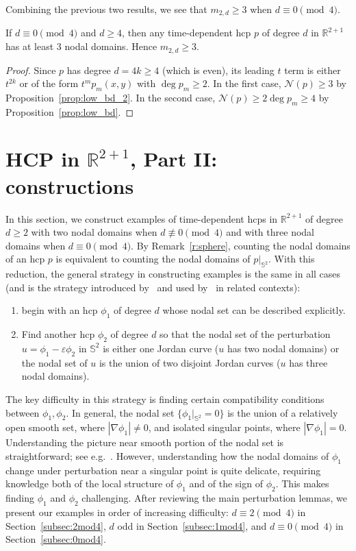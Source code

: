 \documentclass[AHL,Unicode,longabstracts,published]{cedram}
\newcommand{\R}{\mathbb{R}}
\newcommand{\sphere}{\mathbb{S}}
\newcommand{\nodal}{\mathcal{N}}
\renewcommand{\epsilon}{\varepsilon}
\newcommand*{\relabel}{
\renewcommand{\labelenumi}{(\theenumi)}}
\newcommand*{\alphenumi}{
\renewcommand*{\theenumi}{\alph{enumi}}\relabel}
\newcommand{\R}{\mathbb{R}}
\begin{document}
Combining the previous two results, we see that $m_{2,d} \ge 3$ when $d \equiv 0 \pmod 4$.
\begin{coro} \label{cor:0_mod_4}
If $d \equiv 0 \pmod 4$ and $d\geq 4$, then any time-dependent hcp $p$ of degree $d$ in $\R^{2+1}$ has at least $3$ nodal domains. Hence $m_{2,d}\geq 3$.
\end{coro}
\begin{proof}
Since $p$ has degree $d=4k\geq 4$ ({which is even}), its leading $t$ term is either $t^{2k}$ or of the form $t^m p_m(x,y)$ with $\deg p_m \ge 2$. In the first case, $\nodal(p)\geq 3$ by Proposition~\ref{prop:low_bd_2}. In the second case, $\nodal(p)\geq 2\deg p_m\geq 4$ by Proposition~\ref{prop:low_bd}.
\end{proof}


\section{HCP in \texorpdfstring{$\R^{2+1}$}{2+1 dimensions}, Part II: constructions} \label{sec:dim_3_constr}

In this section, we construct examples of time-dependent hcps in $\R^{2+1}$ of degree $d\geq 2$ with two nodal domains when $d \not \equiv 0 \pmod 4$ and with three nodal domains when $d \equiv 0 \pmod 4$. By Remark~\ref{r:sphere}, counting the nodal domains of an hcp $p$ is equivalent to counting the nodal domains of $p|_{\sphere^2}$. With this reduction, the general strategy in constructing examples is the same in all cases (and is the strategy introduced by~\cite{Lewy77} and used by~\cite{BH16,EJN07,LTY15} in related contexts):
\begin{enumerate}\alphenumi
\item begin with an hcp $\phi_1$ of degree $d$ whose nodal set can be described explicitly.
\item Find another hcp $\phi_2$ of degree $d$ so that the nodal set of the perturbation $u=\phi_1 - \epsilon \phi_2$ in $\sphere^2$ is either one Jordan curve ($u$ has two nodal domains) or the nodal set of $u$ is the union of two disjoint Jordan curves ($u$ has three nodal domains).
\end{enumerate}
The key difficulty in this strategy is finding certain compatibility conditions between $\phi_1, \phi_2$. In general, the nodal set $\{ \phi_1|_{\sphere^2} =0 \}$ is the union of a relatively open smooth set, where $|\nabla \phi_1|\neq 0$, and isolated singular points, where $|\nabla \phi_1|=0$. Understanding the picture near smooth portion of the nodal set is straightforward; see e.g.~\cite[Lemma~2]{Lewy77}. However, understanding how the nodal domains of $\phi_1$ change under perturbation near a singular point is quite delicate, requiring knowledge both of the local structure of $\phi_1$ and of the sign of $\phi_2$. This makes finding $\phi_1$ and $\phi_2$ challenging. After reviewing the main perturbation lemmas, we present our examples in order of increasing difficulty: $d\equiv 2\pmod 4$ in Section~\ref{subsec:2mod4}, $d$ odd in Section~\ref{subsec:1mod4}, and $d\equiv 0\pmod 4$ in Section~\ref{subsec:0mod4}.
\end{document}
